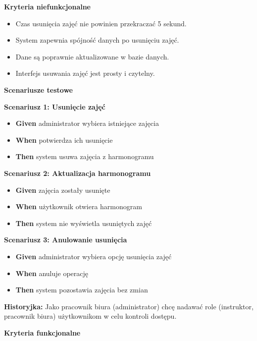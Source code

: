 \documentclass[a4paper,12pt]{article}
\begin{document}
\noindent \textbf{Kryteria niefunkcjonalne}
\begin{itemize}
    \item Czas usunięcia zajęć nie powinien przekraczać 5 sekund.
    \item System zapewnia spójność danych po usunięciu zajęć.
    \item Dane są poprawnie aktualizowane w bazie danych.
    \item Interfejs usuwania zajęć jest prosty i czytelny.
\end{itemize}

\noindent \textbf{Scenariusze testowe}

\textbf{Scenariusz 1: Usunięcie zajęć}
\begin{itemize}
    \item \textbf{Given} administrator wybiera istniejące zajęcia
    \item \textbf{When} potwierdza ich usunięcie
    \item \textbf{Then} system usuwa zajęcia z harmonogramu
\end{itemize}

\textbf{Scenariusz 2: Aktualizacja harmonogramu}
\begin{itemize}
    \item \textbf{Given} zajęcia zostały usunięte
    \item \textbf{When} użytkownik otwiera harmonogram
    \item \textbf{Then} system nie wyświetla usuniętych zajęć
\end{itemize}

\textbf{Scenariusz 3: Anulowanie usunięcia}
\begin{itemize}
    \item \textbf{Given} administrator wybiera opcję usunięcia zajęć
    \item \textbf{When} anuluje operację
    \item \textbf{Then} system pozostawia zajęcia bez zmian
\end{itemize}

\vspace{0,5cm}

\noindent \textbf{Historyjka:} Jako pracownik biura (administrator) chcę nadawać role (instruktor, pracownik biura) użytkownikom w celu kontroli dostępu.

\vspace{0,2cm}

\noindent \textbf{Kryteria funkcjonalne}
\end{document}
